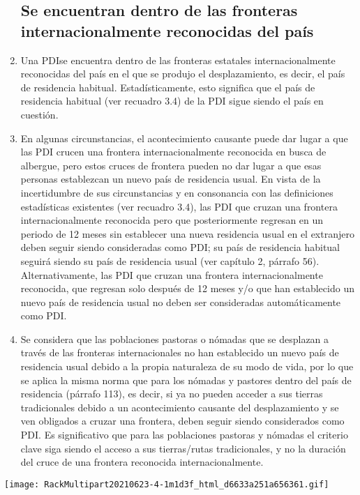 \documentclass[
]{book}
\begin{document}
\begin{enumerate}
{  \subsection{Se encuentran dentro de las fronteras internacionalmente reconocidas del país}\label{se-encuentran-dentro-de-las-fronteras-internacionalmente-reconocidas-del-pauxeds}}
\item
  Una PDIse encuentra dentro de las fronteras estatales internacionalmente reconocidas del país en el que se produjo el desplazamiento, es decir, el país de residencia habitual. Estadísticamente, esto significa que el país de residencia habitual (ver recuadro 3.4) de la PDI sigue siendo el país en cuestión.
\item
  En algunas circunstancias, el acontecimiento causante puede dar lugar a que las PDI crucen una frontera internacionalmente reconocida en busca de albergue, pero estos cruces de frontera pueden no dar lugar a que esas personas establezcan un nuevo país de residencia usual. En vista de la incertidumbre de sus circunstancias y en consonancia con las definiciones estadísticas existentes (ver recuadro 3.4), las PDI que cruzan una frontera internacionalmente reconocida pero que posteriormente regresan en un periodo de 12 meses sin establecer una nueva residencia usual en el extranjero deben seguir siendo consideradas como PDI; su país de residencia habitual seguirá siendo su país de residencia usual (ver capítulo 2, párrafo 56). Alternativamente, las PDI que cruzan una frontera internacionalmente reconocida, que regresan solo después de 12 meses y/o que han establecido un nuevo país de residencia usual no deben ser consideradas automáticamente como PDI.
\item
  Se considera que las poblaciones pastoras o nómadas que se desplazan a través de las fronteras internacionales no han establecido un nuevo país de residencia usual debido a la propia naturaleza de su modo de vida, por lo que se aplica la misma norma que para los nómadas y pastores dentro del país de residencia (párrafo 113), es decir, si ya no pueden acceder a sus tierras tradicionales debido a un acontecimiento causante del desplazamiento y se ven obligados a cruzar una frontera, deben seguir siendo considerados como PDI. Es significativo que para las poblaciones pastoras y nómadas el criterio clave siga siendo el acceso a sus tierras/rutas tradicionales, y no la duración del cruce de una frontera reconocida internacionalmente.
\end{enumerate}

\texttt{[image: RackMultipart20210623-4-1m1d3f\_html\_d6633a251a656361.gif]}
\end{document}
